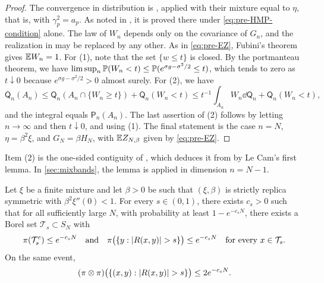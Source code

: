 \begin{proof}
The convergence in distribution is \cite[Lemma~3.2]{HuangMontanariPham2024}, applied with their mixture equal to $\eta$, that is, with $\gamma_p^2=a_p$. As noted in \cite[Remark~3.3]{HuangMontanariPham2024}, it is proved there under \eqref{eq:pre-HMP-condition} alone. The law of $W_n$ depends only on the covariance of $G_n$, and the realization in \cite[(1.1)]{HuangMontanariPham2024} may be replaced by any other. As in \eqref{eq:pre-EZ}, Fubini's theorem gives $\mathbb E W_n=1$. For (1), note that the set $\{w\le t\}$ is closed. By the portmanteau theorem, we have $\limsup_n\mathbb P(W_n<t)\le\mathbb P(e^{\sigma g-\sigma^2/2}\le t)$, which tends to zero as $t\downarrow0$ because $e^{\sigma g-\sigma^2/2}>0$ almost surely. For (2), we have
\[
\mathsf Q_n(A_n)\le\mathsf Q_n(A_n\cap\{W_n\ge t\})+\mathsf Q_n(W_n<t)\le t^{-1}\int_{A_n}W_n\dd\mathsf Q_n+\mathsf Q_n(W_n<t),
\]
and the integral equals $\mathsf P_n(A_n)$. The last assertion of (2) follows by letting $n\to\infty$ and then $t\downarrow0$, and using (1). The final statement is the case $n=N$, $\eta=\beta^2\xi$, and $G_N=\beta H_N$, with $\mathbb E Z_{N,\beta}$ given by \eqref{eq:pre-EZ}.
\end{proof}

Item (2) is the one-sided contiguity of \cite[Corollary~3.5]{HuangMontanariPham2024}, which deduces it from \cite[Lemma~3.2]{HuangMontanariPham2024} by Le Cam's first lemma. In \cref{sec:mixbands}, the lemma is applied in dimension $n=N-1$.

\begin{lemma}\label{lem:pre-HMP-overlap}
Let $\xi$ be a finite mixture and let $\beta>0$ be such that $(\xi,\beta)$ is strictly replica symmetric with $\beta^2\xi''(0)<1$. For every $s\in(0,1)$, there exists $c_s>0$ such that for all sufficiently large $N$, with probability at least $1-e^{-c_sN}$, there exists a Borel set $\mathcal T_s\subset S_N$ with
\begin{equation}\label{eq:pre-typical}
\pi(\mathcal T_s^c)\le e^{-c_sN}\quad\text{and}\quad\pi\big(\{y:\abs{R(x,y)}>s\}\big)\le e^{-c_sN}\quad\text{for every }x\in\mathcal T_s.
\end{equation}
On the same event,
\begin{equation}\label{eq:pre-replica}
(\pi\otimes\pi)\big(\{(x,y):\abs{R(x,y)}>s\}\big)\le2e^{-c_sN}.
\end{equation}
\end{lemma}

